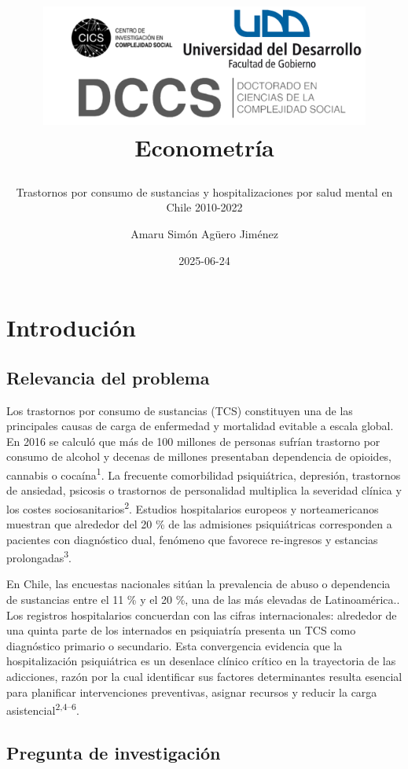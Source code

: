 \documentclass[
  spanish,
  10pt,
]{article}
\title{\begin{center}
  \includegraphics[height=4cm]{logo.png} \\[1cm]
  \Large Econometría \\
\end{center}}
\subtitle{Trastornos por consumo de sustancias y hospitalizaciones por
salud mental en Chile 2010-2022}
\author{Amaru Simón Agüero Jiménez}
\date{2025-06-24}
\renewcommand*\contentsname{Tabla de contenidos}
\newcommand\contentsname{Tabla de contenidos}
\begin{document}
\maketitle

\renewcommand*\contentsname{Tabla de contenidos}
{
\hypersetup{linkcolor=}
\setcounter{tocdepth}{3}
\tableofcontents
}

\newpage

\section{Introdución}\label{introduciuxf3n}

\subsection{Relevancia del problema}\label{relevancia-del-problema}

Los trastornos por consumo de sustancias (TCS) constituyen una de las
principales causas de carga de enfermedad y mortalidad evitable a escala
global. En 2016 se calculó que más de 100 millones de personas sufrían
trastorno por consumo de alcohol y decenas de millones presentaban
dependencia de opioides, cannabis o cocaína\textsuperscript{1}. La
frecuente comorbilidad psiquiátrica, depresión, trastornos de ansiedad,
psicosis o trastornos de personalidad multiplica la severidad clínica y
los costes sociosanitarios\textsuperscript{2}. Estudios hospitalarios
europeos y norteamericanos muestran que alrededor del 20 \% de las
admisiones psiquiátricas corresponden a pacientes con diagnóstico dual,
fenómeno que favorece re-ingresos y estancias
prolongadas\textsuperscript{3}.

En Chile, las encuestas nacionales sitúan la prevalencia de abuso o
dependencia de sustancias entre el 11 \% y el 20 \%, una de las más
elevadas de Latinoamérica.. Los registros hospitalarios concuerdan con
las cifras internacionales: alrededor de una quinta parte de los
internados en psiquiatría presenta un TCS como diagnóstico primario o
secundario. Esta convergencia evidencia que la hospitalización
psiquiátrica es un desenlace clínico crítico en la trayectoria de las
adicciones, razón por la cual identificar sus factores determinantes
resulta esencial para planificar intervenciones preventivas, asignar
recursos y reducir la carga asistencial\textsuperscript{2,4--6}.

\subsection{Pregunta de
investigación}\label{pregunta-de-investigaciuxf3n}
\end{document}
